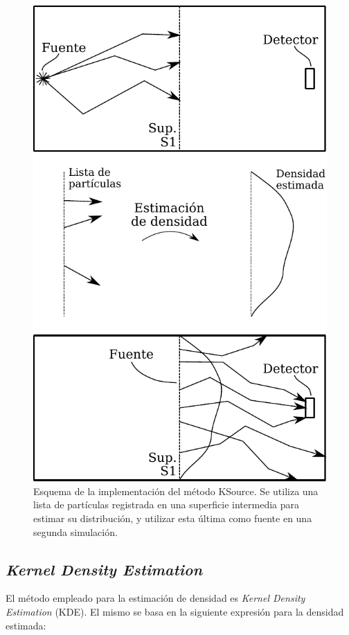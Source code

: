 \begin{figure}[htbp!]
    \centering
    \includegraphics[width=.7\textwidth]{figs/esquema_redvar.pdf}
    \caption{Esquema de la implementación del método KSource. Se utiliza una lista de partículas registrada en una superficie intermedia para estimar su distribución, y utilizar esta última como fuente en una segunda simulación.}
    \label{fig:esq_rv}
\end{figure}


\subsection{\emph{Kernel Density Estimation}}
\label{subsec:kde}

El método empleado para la estimación de densidad es \emph{Kernel Density Estimation} (KDE). El mismo se basa en la siguiente expresión para la densidad estimada:

